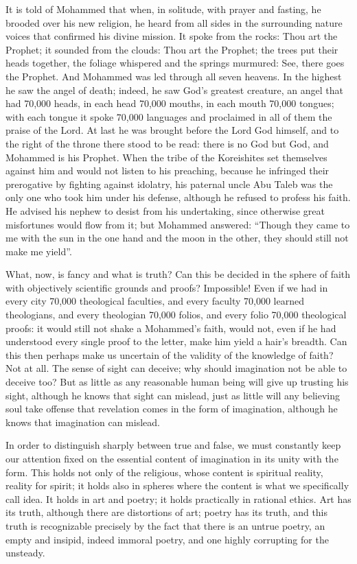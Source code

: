 \documentclass[12pt,a4paper,openany]{book}
\newcommand{\opage}[1]{\marginnote{\footnotesize\textit{[#1]}}}
\begin{document}
It is told of Mohammed that when, in solitude, with prayer and fasting, he brooded over his new religion, he heard from all sides in the surrounding nature voices that confirmed his divine mission. It spoke from the rocks: Thou art the Prophet; it sounded from the clouds: Thou art the Prophet; the trees put their heads together, the foliage whispered and the springs murmured: See, there goes the Prophet. And Mohammed was led through all seven heavens. In the highest he saw the angel of death;
\setcounter{footnote}{0}%
\opage{84}indeed, he saw God's greatest creature, an angel that had 70,000 heads, in each head 70,000 mouths, in each mouth 70,000 tongues; with each tongue it spoke 70,000 languages and proclaimed in all of them the praise of the Lord. At last he was brought before the Lord God himself, and to the right of the throne there stood to be read: there is no God but God, and Mohammed is his Prophet. When the tribe of the Koreishites set themselves against him and would not listen to his preaching, because he infringed their prerogative by fighting against idolatry, his paternal uncle Abu Taleb was the only one who took him under his defense, although he refused to profess his faith. He advised his nephew to desist from his undertaking, since otherwise great misfortunes would flow from it; but Mohammed answered: ``Though they came to me with the sun in the one hand and the moon in the other, they should still not make me yield''.

What, now, is fancy and what is truth? Can this be decided in the sphere of faith with objectively scientific grounds and proofs? Impossible! Even if we had in every city 70,000 theological faculties, and every faculty 70,000 learned theologians, and every theologian 70,000 folios, and every folio 70,000 theological proofs: it would still not shake a Mohammed's faith, would not, even if he had understood every single proof to the letter, make him yield a hair's breadth. Can this then perhaps make us uncertain of the validity of the knowledge of faith? Not at all. The sense of sight can deceive; why should imagination not be able to deceive too? But as little as any reasonable human being will give up trusting his sight, although he knows that sight can mislead, just as little will any believing soul
\setcounter{footnote}{0}%
\opage{85}take offense that revelation comes in the form of imagination, although he knows that imagination can mislead.

In order to distinguish sharply between true and false, we must constantly keep our attention fixed on the essential content of imagination in its unity with the form. This holds not only of the religious, whose content is spiritual reality, reality for spirit; it holds also in spheres where the content is what we specifically call idea. It holds in art and poetry; it holds practically in rational ethics. Art has its truth, although there are distortions of art; poetry has its truth, and this truth is recognizable precisely by the fact that there is an untrue poetry, an empty and insipid, indeed immoral poetry, and one highly corrupting for the unsteady.
\end{document}
